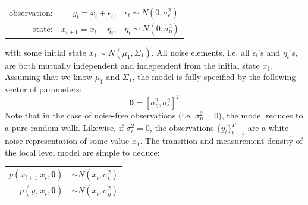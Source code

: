 \documentclass[11pt, oneside]{scrreprt}   	%
\begin{document}
\begin{center}
\begin{tabular}{ r r l }
  observation: & $y_t = x_t + \epsilon_t$, & $\epsilon_t \sim N(0,\sigma_{\epsilon}^2)$ \\
  state: & $x_{t+1} = x_t + \eta_t$, & $\eta_t \sim N(0,\sigma_{\eta}^2)$ \\
\end{tabular}
\end{center}
\bigskip
with some initial state $x_1 \sim N(\mu_1, \Sigma_1)$. All noise elements, i.e. all $\epsilon_t$'s and $\eta_t$'s, are both mutually independent and independent from the initial state $x_1$. Assuming that we know $\mu_1$ and $\Sigma_1$, the model is fully specified by the following vector of parameters:
$$
\boldsymbol{\theta} = [\sigma_{\eta}^2,  \sigma_{\epsilon}^2]^T
$$
Note that in the case of noise-free observations (i.e. $\sigma_{\eta}^2 = 0$), the model reduces to a pure random-walk. Likewise, if $\sigma_{\epsilon}^2 = 0$, the observations $\{y_t\}_{t=1}^T$ are a white noise representation of some value $x_1$. The transition and measurement density of the local level model are simple to deduce:
\begin{center}
\begin{tabular}{ r l }
  $p(x_{t+1} | x_t, \boldsymbol{\theta})$ & $\sim N(x_t,\sigma_{\epsilon}^2)$ \\
  $p(y_t | x_t, \boldsymbol{\theta})$ & $\sim N(x_t,\sigma_{\eta}^2)$ \\
\end{tabular}
\end{center}
\bigskip

\end{document}
